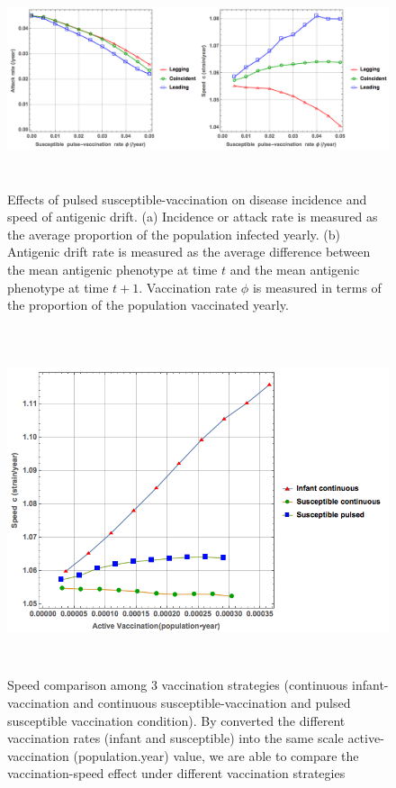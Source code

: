 \documentclass[preprint,12pt]{elsarticle}
\begin{document}
\begin{figure}
  \centering
  \includegraphics[width=6in,height=2.5in]{figures/SusceptibleVpulse}
  \caption{Effects of pulsed susceptible-vaccination on disease incidence and speed of antigenic drift. 
  (a) Incidence or attack rate is measured as the average proportion of the population infected yearly.
  (b) Antigenic drift rate is measured as the average difference between the mean antigenic phenotype at time \(t\) and the mean antigenic phenotype at time \(t+1\).
  Vaccination rate \(\phi\) is measured in terms of the proportion of the population vaccinated yearly.
 }
  \label{fig:SusceptibleVpulse}
\end{figure}


\begin{figure}
  \centering
  \includegraphics[width=6in,height=4in]{figures/Compare3V}
  \caption{Speed comparison among 3 vaccination strategies (continuous infant-vaccination and continuous susceptible-vaccination and pulsed susceptible vaccination condition). By converted the different vaccination rates (infant and susceptible) into the same scale active-vaccination (population.year) value, we are able to compare the vaccination-speed effect under different vaccination strategies}
  \label{fig:Compare3V}
\end{figure}
\end{document}
